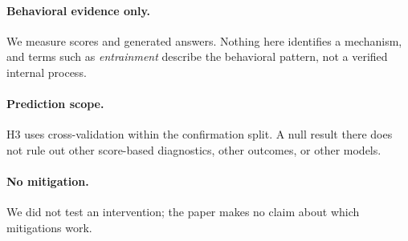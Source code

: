 \paragraph{Behavioral evidence only.} We measure scores and generated answers. Nothing here identifies a
mechanism, and terms such as \emph{entrainment} describe the behavioral pattern, not a verified internal
process.

\paragraph{Prediction scope.} H3 uses cross-validation within the confirmation split. A null result there
does not rule out other score-based diagnostics, other outcomes, or other models.

\paragraph{No mitigation.} We did not test an intervention; the paper makes no claim about which
mitigations work.
